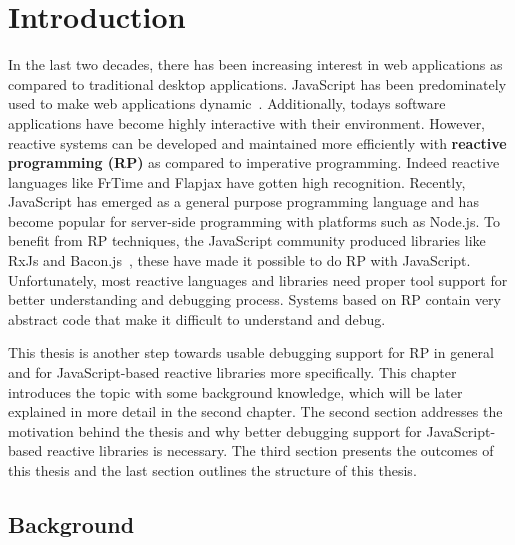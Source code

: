 \chapter{Introduction} \label{chap:Introduction}
In the last two decades, there has been increasing interest in web applications as compared to traditional desktop applications. JavaScript has been predominately used to make web applications dynamic~\cite{6068340}. Additionally, today\textquotesingle s software applications have become highly interactive with their environment. However, reactive systems can be developed and maintained more efficiently with \textbf{reactive programming (RP)} as compared to imperative programming. Indeed reactive languages like FrTime \cite{Cooper2006} and Flapjax \cite{Meyerovich:2009:FPL:1639949.1640091} have gotten high recognition.
Recently, JavaScript has emerged as a general purpose programming language and has become popular for server-side programming with platforms such as Node.js. To benefit from RP techniques, the JavaScript community produced libraries like RxJs\cite{reactivex} and Bacon.js~\cite{BaconJs}, these have made it possible to do RP with JavaScript.
Unfortunately, most reactive languages and libraries need proper tool support for better understanding and debugging process. 
Systems based on RP contain very abstract code that make it difficult to understand and debug.

This thesis is another step towards usable debugging support for RP in general and for JavaScript-based reactive libraries more specifically.
This chapter introduces the topic with some background knowledge, which will be later explained in more detail in the second chapter. The second section addresses the motivation behind the thesis and why better debugging support for JavaScript-based reactive libraries is necessary. The third section presents the outcomes of this thesis and the last section outlines the structure of this thesis.
\section{Background}

